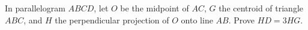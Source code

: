 In parallelogram $ ABCD $, let $ O $ be the midpoint of $ AC $, $ G $ the centroid of triangle $ ABC $, and $ H $ the perpendicular projection of $ O $ onto line $ AB $. Prove $ HD=3HG $.
